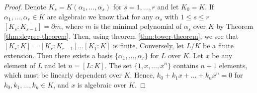 \begin{proof}
    Denote $K_s = K(\alpha_1, \dots, \alpha_s)$ for $s = 1, \dots, r$ and let $K_0 = K$. If \(\alpha_1, \dots , \alpha_r \in K\) are algebraic we know that for any \(\alpha_s\) with \(1 \leq s \leq r\) \( [K_s: K_{s-1}] = \partial m\), where \(m\) is the minimal polynomial of \(\alpha_s\) over \(K\) by Theorem \ref{thm:degree-theorem}. Then, using theorem \ref{thm:tower-theorem}, we see that \([K_r : K] = [K_r:K_{r-1}]\dots[K_1:K]\) is finite. Conversely, let \(L/K\) be a finite extension. Then there exists a basis \(\{\alpha_1, \dots, \alpha_r\}\) for \(L\) over \(K\). Let \(x\) be any element of \(L\) and let \(n = [L:K]\). The set \(\{1,x,\dots,x^n\}\) contains \(n+1\) elements, which must be linearly dependent over \(K\). Hence, \(k_0 + k_1 x + \dots + k_n x^n = 0\) for \(k_0, k_1, \dots, k_n \in K\), and \(x\) is algebraic over \(K\).
\end{proof}



